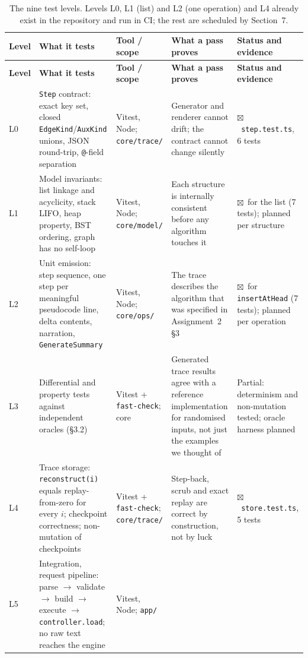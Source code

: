 \documentclass[11pt,a4paper]{article}
\newcommand{\ct}[1]{\texttt{#1}}
\newcommand{\done}{\textcolor{okc}{$\boxtimes$}}
\begin{document}
{\footnotesize
\setlength{\tabcolsep}{4pt}
\begin{longtable}{@{}L{0.9cm}L{3.2cm}L{3.5cm}L{3.9cm}L{3.2cm}@{}}
\caption{The nine test levels. Levels L0, L1 (list) and L2 (one operation) and L4 already
exist in the repository and run in CI; the rest are scheduled by Section~7.}\label{tab:levels}\\
\toprule
\textbf{Level} & \textbf{What it tests} & \textbf{Tool / scope} & \textbf{What a pass proves} &
\textbf{Status and evidence} \\
\midrule
\endfirsthead
\toprule
\textbf{Level} & \textbf{What it tests} & \textbf{Tool / scope} & \textbf{What a pass proves} &
\textbf{Status and evidence} \\
\midrule
\endhead
\bottomrule
\endlastfoot
L0 & \ct{Step} contract: exact key set, closed \ct{EdgeKind}/\ct{AuxKind} unions, JSON
round-trip, \ct{@}-field separation & Vitest, Node; \ct{core/trace/} &
Generator and renderer cannot drift; the contract cannot change silently &
\done\ \ct{step.test.ts}, 6 tests \\
L1 & Model invariants: list linkage and acyclicity, stack LIFO, heap property, BST ordering,
graph has no self-loop & Vitest, Node; \ct{core/model/} &
Each structure is internally consistent before any algorithm touches it &
\done\ for the list (7 tests); planned per structure \\
L2 & Unit emission: step sequence, one step per meaningful pseudocode line, delta contents,
narration, \ct{GenerateSummary} & Vitest, Node; \ct{core/ops/} &
The trace describes the algorithm that was specified in Assignment~2 \S3 &
\done\ for \ct{insertAtHead} (7 tests); planned per operation \\
L3 & Differential and property tests against independent oracles (\S3.2) & Vitest +
\ct{fast-check}; core & Generated trace results agree with a reference implementation for
randomised inputs, not just the examples we thought of &
Partial: determinism and non-mutation tested; oracle harness planned \\
L4 & Trace storage: \ct{reconstruct(i)} equals replay-from-zero for every $i$; checkpoint
correctness; non-mutation of checkpoints & Vitest + \ct{fast-check}; \ct{core/trace/} &
Step-back, scrub and exact replay are correct by construction, not by luck &
\done\ \ct{store.test.ts}, 5 tests \\
L5 & Integration, request pipeline: parse $\to$ validate $\to$ build $\to$ execute $\to$
\ct{controller.load}; no raw text reaches the engine & Vitest, Node; \ct{app/} &

\end{longtable}}
\end{document}
